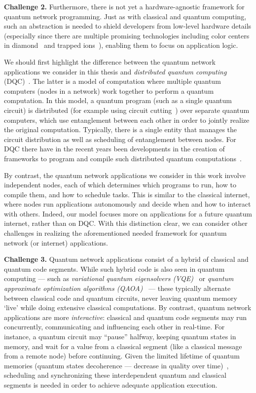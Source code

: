 \textbf{Challenge 2.} Furthermore, there is not yet a hardware-agnostic framework for quantum network programming.
Just as with classical and quantum computing, such an abstraction is needed to shield developers from low-level hardware details (especially since there are multiple promising technologies including color centers in diamond~\cite{ruf_quantum_2021} and trapped ions~\cite{monroe_quantum_2013, reiserer_cavity-based_2015}), enabling them to focus on application logic.

We should first highlight the difference between the quantum network applications we consider in this thesis and \emph{distributed quantum computing} (DQC)~\cite{caleffi_distributed_2024}.
The latter is a model of computation where multiple quantum computers (nodes in a network) work together to perform a quantum computation.
In this model, a quantum program (such as a single quantum circuit) is distributed (for example using circuit cutting~\cite{chatterjee_qurzon_2022}) over separate quantum computers, which use entanglement between each other in order to jointly realize the original computation.
Typically, there is a single entity that manages the circuit distribution as well as scheduling of entanglement between nodes.
For DQC there have in the recent years been developments in the creation of frameworks to program and compile such distributed quantum computations~\cite{chatterjee_qurzon_2022, cuomo_optimized_2023, ferrari_modular_2023}.

By contrast, the quantum network applications we consider in this work involve independent nodes, each of which determines which programs to run, how to compile them, and how to schedule tasks.
This is similar to the classical internet, where nodes run applications autonomously and decide when and how to interact with others.
Indeed, our model focuses more on applications for a future quantum internet, rather than on DQC.
With this distinction clear, we can consider other challenges in realizing the aforementioned needed framework for quantum network (or internet) applications.

\textbf{Challenge 3.} Quantum network applications consist of a hybrid of classical and quantum code segments.
While such hybrid code is also seen in quantum computing --- such as \textit{variational quantum eigensolvers (VQE)}~\cite{diadamo2021distributed, liu2022layer} or \textit{quantum approximate optimization algorithms (QAOA)}~\cite{farhi2014quantum} ---
these typically alternate between classical code and quantum circuits, never leaving quantum memory `live' while doing extensive classical computations.
By contrast, quantum network applications are more \textit{interactive}: classical and quantum code segments may run concurrently, communicating and influencing each other in real-time.
For instance, a quantum circuit may ``pause'' halfway, keeping quantum states in memory, and wait for a value from a classical segment (like a classical message from a remote node) before continuing.
Given the limited lifetime of quantum memories (quantum states decoherence --- decrease in quality over time)~\cite{shor_scheme_1995}, scheduling and synchronizing these interdependent quantum and classical segments is needed in order to achieve adequate application execution.

